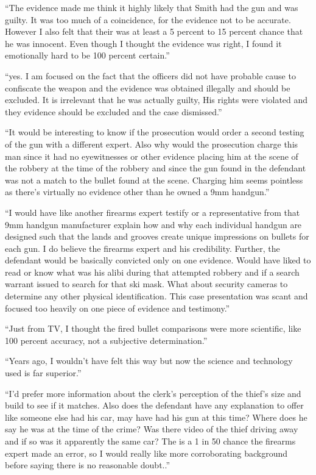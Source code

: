 \documentclass[print]{nuthesis}
\begin{document}
``The evidence made me think it highly likely that Smith had the gun and was guilty. It was too much of a coincidence, for the evidence not to be accurate. However I also felt that their was at least a 5 percent to 15 percent chance that he was innocent. Even though I thought the evidence was right, I found it emotionally hard to be 100 percent certain.''

``yes. I am focused on the fact that the officers did not have probable cause to confiscate the weapon and the evidence was obtained illegally and should be excluded. It is irrelevant that he was actually guilty, His rights were violated and they evidence should be excluded and the case dismissed.''

``It would be interesting to know if the prosecution would order a second testing of the gun with a different expert. Also why would the prosecution charge this man since it had no eyewitnesses or other evidence placing him at the scene of the robbery at the time of the robbery and since the gun found in the defendant was not a match to the bullet found at the scene. Charging him seems pointless as there's virtually no evidence other than he owned a 9mm handgun.''

``I would have like another firearms expert testify or a representative from that 9mm handgun manufacturer explain how and why each individual handgun are designed such that the lands and grooves create unique impressions on bullets for each gun. I do believe the firearms expert and his credibility. Further, the defendant would be basically convicted only on one evidence. Would have liked to read or know what was his alibi during that attempted robbery and if a search warrant issued to search for that ski mask. What about security cameras to determine any other physical identification. This case presentation was scant and focused too heavily on one piece of evidence and testimony.''

``Just from TV, I thought the fired bullet comparisons were more scientific, like 100 percent accuracy, not a subjective determination.''

``Years ago, I wouldn't have felt this way but now the science and technology used is far superior.''

``I'd prefer more information about the clerk's perception of the thief's size and build to see if it matches. Also does the defendant have any explanation to offer like someone else had his car, may have had his gun at this time? Where does he say he was at the time of the crime? Was there video of the thief driving away and if so was it apparently the same car? The is a 1 in 50 chance the firearms expert made an error, so I would really like more corroborating background before saying there is no reasonable doubt..''
\end{document}
